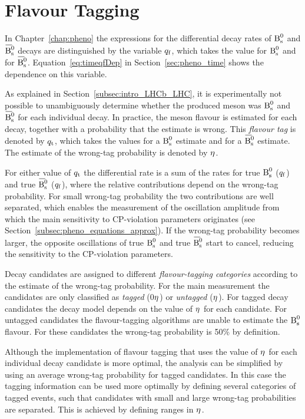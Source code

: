\section{Flavour Tagging}
\label{sec:ana_tagging}

In Chapter~\ref{chap:pheno} the expressions for the differential decay rates of $\text{B}_\text{s}^\text{0}$ and $\Bsbar$ decays are distinguished by the
variable ${q_\mathrm{f}}$, which takes the value  for $\text{B}_\text{s}^\text{0}$ and  for $\Bsbar$. Equation~\ref{eq:timeqfDep} in Section~\ref{sec:pheno_time}
shows the dependence on this variable.

As explained in Section~\ref{subsec:intro_LHCb_LHC}, it is experimentally not possible to unambiguously determine whether the produced
meson was $\text{B}_\text{s}^\text{0}$ and $\Bsbar$ for each individual decay. In practice, the meson flavour is estimated for each decay, together with a
probability that the estimate is wrong. This \emph{flavour tag} is denoted by $q_\mathrm{t}$, which takes the values  for a $\text{B}_\text{s}^\text{0}$ estimate and
 for a $\Bsbar$ estimate. The estimate of the wrong-tag probability is denoted by $\eta^{}$.

For either value of $q_\mathrm{t}$ the differential rate is a sum of the rates for true $\text{B}_\text{s}^\text{0}$ (${q_\mathrm{f}}$\texteq{}) and true $\Bsbar$
(${q_\mathrm{f}}$\texteq{}), where the relative contributions depend on the wrong-tag probability. For small wrong-tag probability the two
contributions are well separated, which enables the measurement of the oscillation amplitude from which the main sensitivity to
CP-violation parameters originates (see Section~\ref{subsec:pheno_equations_approx}). If the wrong-tag probability becomes larger, the
opposite oscillations of true $\text{B}_\text{s}^\text{0}$ and true $\Bsbar$ start to cancel, reducing the sensitivity to the CP-violation parameters.

Decay candidates are assigned to different \emph{flavour-tagging categories} according to the estimate of the wrong-tag probability. For
the main measurement the candidates are only classified as \emph{tagged} (0\textle$\eta^{}$) or \emph{untagged}
($\eta^{}$). For tagged decay candidates the decay model depends on the value of $\eta^{}$ for each candidate. For untagged
candidates the flavour-tagging algorithms are unable to estimate the $\text{B}_\text{s}^\text{0}$ flavour. For these candidates the wrong-tag probability is 50\%
by definition.

Although the implementation of flavour tagging that uses the value of $\eta^{}$ for each individual decay candidate is more optimal, the
analysis can be simplified by using an average wrong-tag probability for tagged candidates. In this case the tagging information can be
used more optimally by defining several categories of tagged events, such that candidates with small and large wrong-tag probabilities are
separated. This is achieved by defining ranges in $\eta^{}$.

